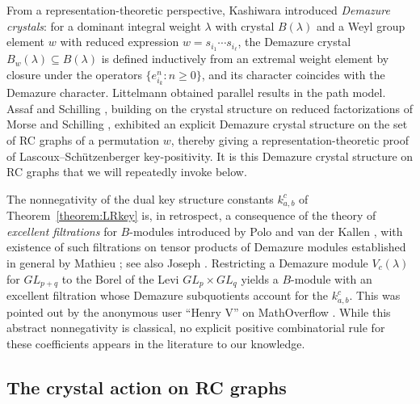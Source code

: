 \documentclass{amsart}
\theoremstyle{definition}
\theoremstyle{remark}
\numberwithin{equation}{subsection}
\begin{document}
From a representation-theoretic perspective, Kashiwara \cite{kashiwara1993crystal} introduced \emph{Demazure crystals}: for a dominant integral weight $\lambda$ with crystal $B(\lambda)$ and a Weyl group element $w$ with reduced expression $w=s_{i_1}\cdots s_{i_\ell}$, the Demazure crystal $B_w(\lambda)\subseteq B(\lambda)$ is defined inductively from an extremal weight element by closure under the operators $\{e_{i_k}^n : n\geq 0\}$, and its character coincides with the Demazure character. Littelmann \cite{littelmann1995crystal} obtained parallel results in the path model. Assaf and Schilling \cite{assaf2018demazure}, building on the crystal structure on reduced factorizations of Morse and Schilling \cite{morse2016crystal}, exhibited an explicit Demazure crystal structure on the set of RC graphs of a permutation $w$, thereby giving a representation-theoretic proof of Lascoux--Schützenberger key-positivity. It is this Demazure crystal structure on RC graphs that we will repeatedly invoke below.

The nonnegativity of the dual key structure constants $k_{a,b}^c$ of Theorem~\ref{theorem:LRkey} is, in retrospect, a consequence of the theory of \emph{excellent filtrations} for $B$-modules introduced by Polo \cite{polo1989excellent} and van der Kallen \cite{vanderkallen1989longest}, with existence of such filtrations on tensor products of Demazure modules established in general by Mathieu \cite{mathieu1990filtrations}; see also Joseph \cite{joseph1985demazure}. Restricting a Demazure module $V_c(\lambda)$ for $GL_{p+q}$ to the Borel of the Levi $GL_p\times GL_q$ yields a $B$-module with an excellent filtration whose Demazure subquotients account for the $k_{a,b}^c$. This was pointed out by the anonymous user ``Henry V'' on MathOverflow \cite{henrymath}. While this abstract nonnegativity is classical, no explicit positive combinatorial rule for these coefficients appears in the literature to our knowledge.

\subsection{The crystal action on RC graphs}\label{section:crystalaction}
\end{document}
